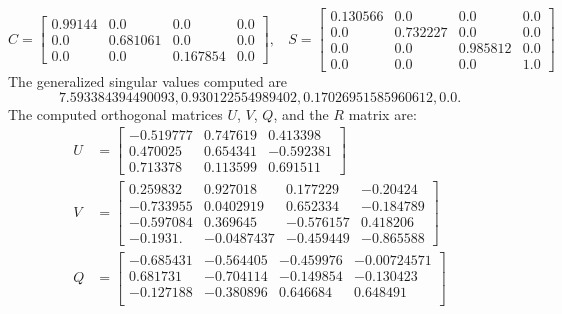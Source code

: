 \begin{example}
{\begin{enumerate}[(1).]
            \begin{equation*}
                C = \begin{bmatrix}
                 0.99144 & 0.0      & 0.0      & 0.0 \\
                 0.0     & 0.681061 & 0.0      & 0.0 \\
                 0.0     & 0.0      & 0.167854 & 0.0
                \end{bmatrix}, \ \ \ \
                S = \begin{bmatrix}
                 0.130566 & 0.0      & 0.0       & 0.0 \\
                 0.0      & 0.732227 & 0.0       & 0.0 \\
                 0.0      & 0.0      & 0.985812  & 0.0 \\
                 0.0      & 0.0      & 0.0       & 1.0
                \end{bmatrix}
            \end{equation*}
The generalized singular values computed are 
\[ 
7.593384394490093, 0.930122554989402, 0.17026951585960612, 0.0.
\] 
The computed orthogonal matrices $U$, $V$, $Q$, and the $R$ matrix are: 
            \begin{align*}
                U &= \begin{bmatrix}
                 -0.519777 & 0.747619  & 0.413398 \\
                  0.470025 & 0.654341  &-0.592381 \\
                  0.713378 & 0.113599  & 0.691511
                \end{bmatrix} \\
                V &= \begin{bmatrix}
                  0.259832 &  0.927018   & 0.177229  & -0.20424  \\
                 -0.733955 &  0.0402919  & 0.652334  & -0.184789 \\
                 -0.597084 &  0.369645   &-0.576157  & 0.418206 \\
                 -0.1931.  & -0.0487437  &-0.459449  & -0.865588
                \end{bmatrix} \\
                Q &= \begin{bmatrix}
                 -0.685431 & -0.564405 & -0.459976 & -0.00724571 \\
                  0.681731 & -0.704114 & -0.149854 & -0.130423   \\
                 -0.127188 & -0.380896 &  0.646684 &  0.648491   \\

\end{bmatrix}
\end{align*}
\end{enumerate}}
\end{example}
